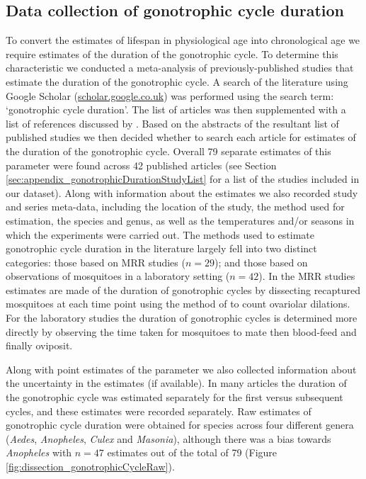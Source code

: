 \documentclass[12pt]{article}
\begin{document}
{\subsection{Data collection of gonotrophic cycle duration}\label{sec:dissection_gonotrophicData}
To convert the estimates of lifespan in physiological age into chronological age we require estimates of the duration of the gonotrophic cycle. To determine this characteristic we conducted a meta-analysis of previously-published studies that estimate the duration of the gonotrophic cycle. A search of the literature using Google Scholar (\url{scholar.google.co.uk}) was performed using the search term: `gonotrophic cycle duration'. The list of articles was then supplemented with a list of references discussed by \cite{silver2007mosquito}. Based on the abstracts of the resultant list of published studies we then decided whether to search each article for estimates of the duration of the gonotrophic cycle. Overall 79 separate estimates of this parameter were found across 42 published articles (see Section \ref{sec:appendix_gonotrophicDurationStudyList} for a list of the studies included in our dataset). Along with information about the estimates we also recorded study and series meta-data, including the location of the study, the method used for estimation, the species and genus, as well as the temperatures and/or seasons in which the experiments were carried out. The methods used to estimate gonotrophic cycle duration in the literature largely fell into two distinct categories: those based on MRR studies ($n=29$); and those based on observations of mosquitoes in a laboratory setting ($n=42$). In the MRR studies estimates are made of the duration of gonotrophic cycles by dissecting recaptured mosquitoes at each time point using the method of \cite{polovodova1949determination} to count ovariolar dilations. For the laboratory studies the duration of gonotrophic cycles is determined more directly by observing the time taken for mosquitoes to mate then blood-feed and finally oviposit.

Along with point estimates of the parameter we also collected information about the uncertainty in the estimates (if available). In many articles the duration of the gonotrophic cycle was estimated separately for the first versus subsequent cycles, and these estimates were recorded separately. Raw estimates of gonotrophic cycle duration were obtained for species across four different genera (\textit{Aedes}, \textit{Anopheles}, \textit{Culex} and \textit{Masonia}), although there was a bias towards \textit{Anopheles} with $n=47$ estimates out of the total of 79 (Figure \ref{fig:dissection_gonotrophicCycleRaw}). 

}
\end{document}
